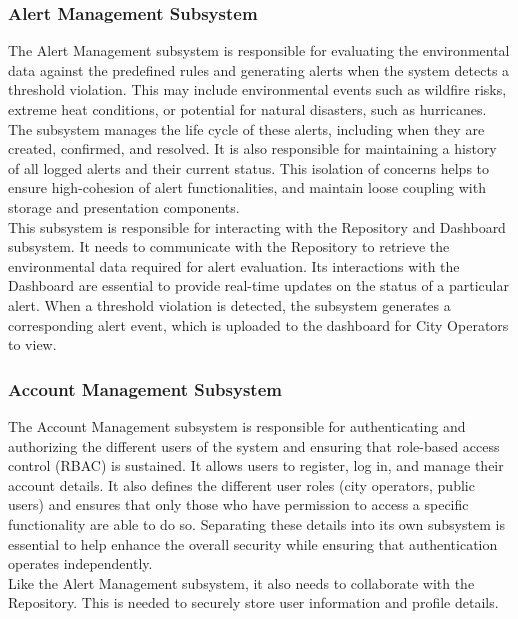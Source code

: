 \documentclass[]{article}
\begin{document}
\subsubsection{Alert Management Subsystem}
The Alert Management subsystem is responsible for evaluating the environmental data against the predefined rules and generating alerts when the system detects a threshold violation. This may include environmental events such as wildfire risks, extreme heat conditions, or potential for natural disasters, such as hurricanes. The subsystem manages the life cycle of these alerts, including when they are created, confirmed, and resolved. It is also responsible for maintaining a history of all logged alerts and their current status. This isolation of concerns helps to ensure high-cohesion of alert functionalities, and maintain loose coupling with storage and presentation components.\\

\noindent This subsystem is responsible for interacting with the Repository and Dashboard subsystem. It needs to communicate with the Repository to retrieve the environmental data required for alert evaluation. Its interactions with the Dashboard are essential to provide real-time updates on the status of a particular alert. When a threshold violation is detected, the subsystem generates a corresponding alert event, which is uploaded to the dashboard for City Operators to view. 

\subsubsection{Account Management Subsystem}
The Account Management subsystem is responsible for authenticating and authorizing the different users of the system and ensuring that role-based access control (RBAC) is sustained. It allows users to register, log in, and manage their account details. It also defines the different user roles (city operators, public users) and ensures that only those who have permission to access a specific functionality are able to do so. Separating these details into its own subsystem is essential to help enhance the overall security while ensuring that authentication operates independently. \\

\noindent Like the Alert Management subsystem, it also needs to collaborate with the Repository. This is needed to securely store user information and profile details.
\end{document}
